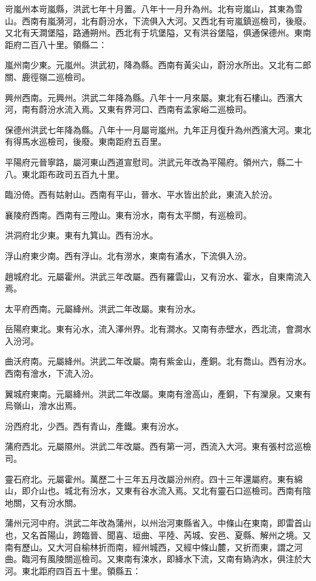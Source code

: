 岢嵐州本岢嵐縣，洪武七年十月置。八年十一月升為州。北有岢嵐山，其東為雪山。西南有嵐漪河，北有蔚汾水，下流俱入大河。又西北有岢嵐鎮巡檢司，後廢。又北有天澗堡隘，路通朔州。西北有于坑堡隘，又有洪谷堡隘，俱通保德州。東南距府二百八十里。領縣二：

嵐州南少東。元嵐州。洪武初，降為縣。西南有黃尖山，蔚汾水所出。又北有二郎關、鹿徑嶺二巡檢司。

興州西南。元興州。洪武二年降為縣。八年十一月來屬。東北有石樓山。西濱大河，南有蔚汾水流入焉。又東有界河口、西南有孟家峪二巡檢司。

保德州洪武七年降為縣。八年十一月屬岢嵐州。九年正月復升為州西濱大河。東北有得馬水巡檢司，後廢。東南距府五百里。

平陽府元晉寧路，屬河東山西道宣慰司。洪武元年改為平陽府。領州六，縣二十八。東北距布政司五百九十里。

臨汾倚。西有姑射山。西南有平山，晉水、平水皆出於此，東流入於汾。

襄陵府西南。西南有三隥山。東有汾水，南有太平關，有巡檢司。

洪洞府北少東。東有九箕山。西有汾水。

浮山府東少南。西有浮山。北有澇水，東南有潏水，下流俱入汾。

趙城府北。元屬霍州。洪武三年改屬。西有羅雲山，又有汾水、霍水，自東南流入焉。

太平府西南。元屬絳州。洪武二年改屬。東有汾水。

岳陽府東北。東有沁水，流入澤州界。北有澗水。又南有赤壁水，西北流，會澗水入汾河。

曲沃府南。元屬絳州。洪武二年改屬。南有紫金山，產銅。北有喬山。西有汾水。西南有澮水，下流入汾。

翼城府東南。元屬絳州。洪武二年改屬。東南有澮高山，產銅，下有灤泉。又東有烏嶺山，澮水出焉。

汾西府北，少西。西有青山，產鐵。東有汾水。

蒲府西北。元屬隰州。洪武二年改屬。西有第一河，西流入大河。東有張村岔巡檢司。

靈石府北。元屬霍州。萬歷二十三年五月改屬汾州府。四十三年還屬府。東有綿山，即介山也。城北有汾水，又東有谷水流入焉。又北有靈石口巡檢司。西南有陰地關，又有汾水關。

蒲州元河中府。洪武二年改為蒲州，以州治河東縣省入。中條山在東南，即雷首山也，又名首陽山，跨臨晉、聞喜、垣曲、平陸、芮城、安邑、夏縣、解州之境。又南有歷山。又大河自榆林折而南，經州城西，又經中條山麓，又折而東，謂之河曲。臨河有風陵關巡檢司。又東南有涑水，即絳水下流，又南有媯汭水，俱注於大河。東北距府四百五十里。領縣五：

